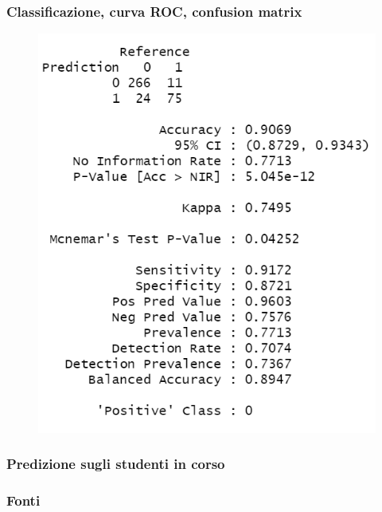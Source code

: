 \documentclass{beamer}
\begin{document}
\begin{frame}
\frametitle{Classificazione, curva ROC, confusion matrix}
\begin{figure}[h]
    \centering
    \includegraphics[width=.7\textwidth]{Screenshot 2024-05-26 122256.png} %
    \label{}
\end{figure}

\end{frame}

\begin{frame}

\frametitle{Predizione sugli studenti in corso}


\end{frame}








\begin{frame}
\frametitle{Fonti}


\end{frame}


\end{document}
